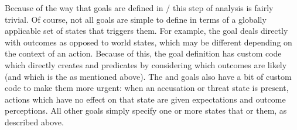 \begin{enumerate}
Because of the way that goals are defined in \dunyazad/ this step of analysis is fairly trivial.
%
Of course, not all goals are simple to define in terms of a globally applicable set of states that triggers them.
%
For example, the  goal deals directly with outcomes as opposed to world states, which may be different depending on the context of an action.
%
Because of this, the  goal definition has custom code which directly creates  and  predicates by considering which outcomes are likely (and which is the  as mentioned above).
%
The  and  goals also have a bit of custom code to make them more urgent: when an accusation or threat state is present, actions which have no effect on that state are given  expectations and  outcome perceptions.
%
All other goals simply specify one or more states that    or  them, as described above.


\end{enumerate}

